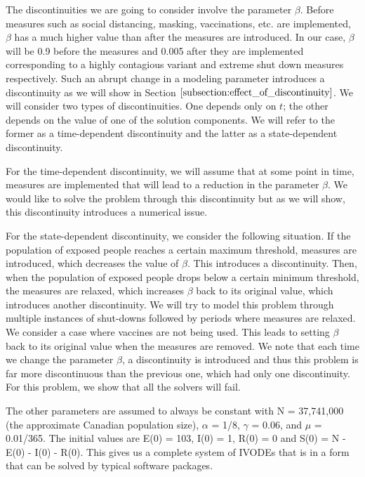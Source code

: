 The discontinuities we are going to consider involve the parameter $\beta$.
Before measures such as social distancing, masking, vaccinations, etc. are implemented, $\beta$ has a much higher value than after the measures are introduced. In our case, $\beta$ will be 0.9 before the measures and 0.005 after they are implemented corresponding to a highly contagious variant and extreme shut down measures respectively. Such an abrupt change in a modeling parameter introduces a discontinuity as we will show in Section $\ref{subsection:effect_of_discontinuity}$. We will consider two types of discontinuities. One depends only on $t$; the other depends on the value of one of the solution components. We will refer to the former as a time-dependent discontinuity and the latter as a state-dependent discontinuity.

For the time-dependent discontinuity, we will assume that at some point in time, measures are implemented that will lead to a reduction in the parameter $\beta$. We would like to solve the problem through this discontinuity but as we will show, this discontinuity introduces a numerical issue.

For the state-dependent discontinuity, we consider the following situation. If the population of exposed people reaches a certain maximum threshold, measures are introduced, which decreases the value of $\beta$. This introduces a discontinuity. Then, when the population of exposed people drops below a certain minimum threshold, the measures are relaxed, which increases $\beta$ back to its original value, which introduces another discontinuity. We will try to model this problem through multiple instances of shut-downs followed by periods where measures are relaxed. We consider a case where vaccines are not being used. This leads to setting $\beta$ back to its original value when the measures are removed. We note that each time we change the parameter $\beta$, a discontinuity is introduced and thus this problem is far more discontinuous than the previous one, which had only one discontinuity. For this problem, we show that all the solvers will fail.

The other parameters are assumed to always be constant with N = 37,741,000 (the approximate Canadian population size), $\alpha$ = 1/8, $\gamma$ = 0.06, and $\mu$ = 0.01/365. The initial values are E(0) = 103, I(0) = 1, R(0) = 0 and S(0) = N - E(0) - I(0) - R(0). This gives us a complete system of IVODEs that is in a form that can be solved by typical software packages.

